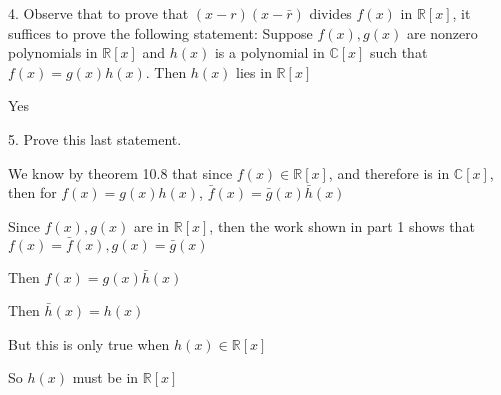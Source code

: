 \documentclass[12pt]{article}
\begin{document}
\begin{itemize}
	4. Observe that to prove that $(x-r)(x-\bar{r})$ divides $f(x)$ in $\mathbb{R}[x]$, it suffices to prove the following statement: Suppose $f(x), g(x)$ are nonzero polynomials in $\mathbb{R}[x]$ and $h(x)$ is a polynomial in $\mathbb{C}[x]$ such that $f(x) = g(x)h(x)$. Then $h(x)$ lies in $\mathbb{R}[x]$

	Yes

	5. Prove this last statement.

	We know by theorem 10.8 that since $f(x) \in \mathbb{R}[x]$, and therefore is in $\mathbb{C}[x]$, then for $f(x) = g(x)h(x)$, $\bar{f}(x) = \bar{g}(x)\bar{h}(x)$

	Since $f(x), g(x)$ are in $\mathbb{R}[x]$, then the work shown in part 1 shows that $f(x) = \bar{f}(x), g(x) = \bar{g}(x)$

	Then $f(x) = g(x)\bar{h}(x)$

	Then $\bar{h}(x) = h(x)$

	But this is only true when $h(x) \in \mathbb{R}[x]$

	So $h(x)$ must be in $\mathbb{R}[x]$
	

\end{itemize}
\end{document}
